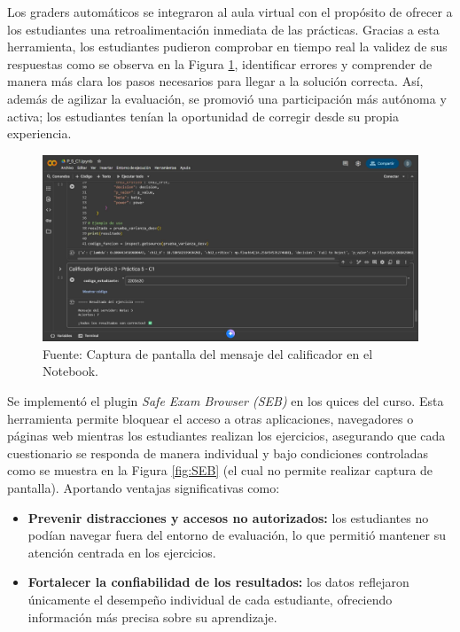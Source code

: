 \documentclass[letter,oneside,12pt,spanish]{report}
\begin{document}
Los graders automáticos se integraron al aula virtual con el propósito de ofrecer a los estudiantes una retroalimentación inmediata de las prácticas. Gracias a esta herramienta, los estudiantes pudieron comprobar en tiempo real la validez de sus respuestas como se observa en la Figura \ref{fig:Colab}, identificar errores y comprender de manera más clara los pasos necesarios para llegar a la solución correcta. Así, además de agilizar la evaluación, se promovió una participación más autónoma y activa; los estudiantes tenían la oportunidad de corregir desde su propia experiencia.

\begin{figure}[ht]
	\centering
	\includegraphics[width=1\textwidth]{Figs/Colab.pdf}
	\label{fig:Colab}
	\\Fuente: Captura de pantalla del mensaje del calificador en el Notebook.
\end{figure}
\newpage
Se implementó el plugin \textit{Safe Exam Browser (SEB)} en los quices del curso. Esta herramienta permite bloquear el acceso a otras aplicaciones, navegadores o páginas web mientras los estudiantes realizan los ejercicios, asegurando que cada cuestionario se responda de manera individual y bajo condiciones controladas como se muestra en la Figura \ref{fig:SEB} (el cual no permite realizar captura de pantalla). Aportando ventajas significativas como:

\begin{itemize}
    \item \textbf{Prevenir distracciones y accesos no autorizados:} los estudiantes no podían navegar fuera del entorno de evaluación, lo que permitió mantener su atención centrada en los ejercicios.
    \item \textbf{Fortalecer la confiabilidad de los resultados:} los datos reflejaron únicamente el desempeño individual de cada estudiante, ofreciendo información más precisa sobre su aprendizaje.
\end{itemize}
\end{document}
